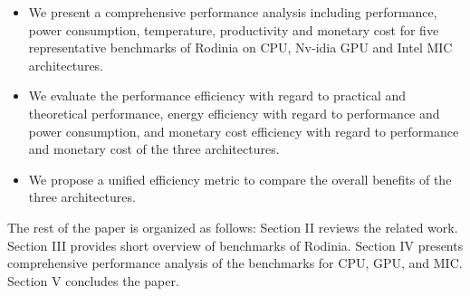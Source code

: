   
\begin{itemize}    
\item  We present a comprehensive performance analysis including performance, power consumption, temperature, productivity and monetary cost for five representative benchmarks of Rodinia on CPU, Nv-idia GPU and Intel MIC architectures.    
\item  We evaluate the performance efficiency with regard to practical and theoretical performance, energy efficiency with regard to performance and power consumption, and monetary cost efficiency with regard to performance and monetary cost of the three architectures.    
\item  We propose a unified efficiency metric to compare the overall benefits of the three architectures.
\end{itemize}

The rest of the paper is organized as follows: Section II reviews the related work. %
Section III provides short overview of benchmarks of Rodinia. Section IV presents comprehensive performance analysis of the benchmarks for CPU, GPU, and MIC. Section V concludes the paper.
